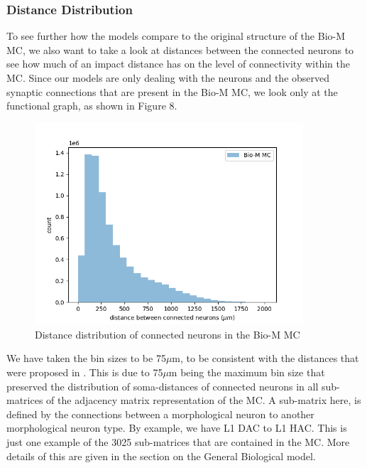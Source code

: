 \subsubsection{Distance Distribution}
To see further how the models compare to the original structure of the Bio-M MC, we also want to take a look at distances between the connected neurons to see how much of an impact distance has on the level of connectivity within the MC. Since our models are only dealing with the neurons and the observed synaptic connections that are present in the Bio-M MC, we look only at the functional graph, as shown in Figure 8.

\begin{figure}[H]
\begin{center}
\captionsetup{justification=centering}
\includegraphics[width=10cm]{BioM/BioM_dist_distr.png}
\caption{Distance distribution of connected neurons in the Bio-M MC}
\end{center}
\end{figure}

We have taken the bin sizes to be 75\(\mu\)m, to be consistent with the distances that were proposed in \cite{Reimann_2017}. This is due to 75$\mu$m being the maximum bin size that preserved the distribution of soma-distances of connected neurons in all sub-matrices of the adjacency matrix representation of the MC. A sub-matrix here, is defined by the connections between a morphological neuron to another morphological neuron type. By example, we have L1 DAC to L1 HAC. This is just one example of the 3025 sub-matrices that are contained in the MC. More details of this are given in the section on the General Biological model.

